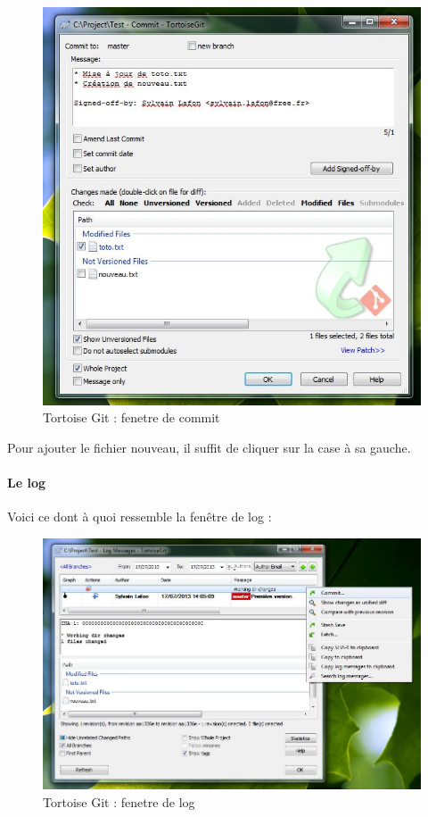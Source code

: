 \begin{figure}[h] 
	\begin{center}
		\includegraphics[scale=0.3]{../IMG/commit.jpg}
	\end{center}
	\caption{Tortoise Git : fenetre de commit}
	\label{Tortoise Git : fenetre de commit} 
\end{figure}

Pour ajouter le fichier nouveau, il suffit de cliquer sur la case à sa gauche.\\

\paragraph{Le log } Voici ce dont à quoi ressemble la fenêtre de log :

\begin{figure}[h] 
	\begin{center}
		\includegraphics[scale=0.3]{../IMG/log.jpg}
	\end{center}
	\caption{Tortoise Git : fenetre de log}
	\label{Tortoise Git : fenetre de log} 
\end{figure}

